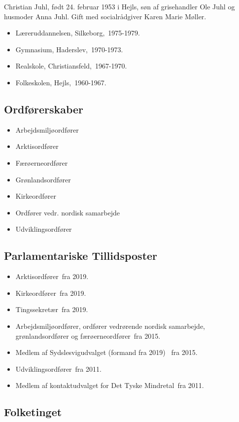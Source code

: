 \documentclass[11pt, a4paper]{awesome-cv}
\begin{document}
\makecvheader[R]
\makelettertitle
\begin{cvletter}
Christian Juhl, født 24. februar 1953 i Hejls, søn af grisehandler Ole Juhl og husmoder Anna Juhl. Gift med socialrådgiver Karen Marie Møller.

\begin{itemize}
\item Læreruddannelsen, Silkeborg, 1975-1979.
\item Gymnasium, Haderslev, 1970-1973.
\item Realskole, Christiansfeld, 1967-1970.
\item Folkeskolen, Hejls, 1960-1967.
\end{itemize}
\subsection*{Ordførerskaber}
\begin{itemize}
\item Arbejdsmiljøordfører
\item Arktisordfører
\item Færøerneordfører
\item Grønlandsordfører
\item Kirkeordfører
\item Ordfører vedr. nordisk samarbejde
\item Udviklingsordfører
\end{itemize}
\subsection*{Parlamentariske Tillidsposter}
\begin{itemize}
\item Arktisordfører fra 2019.
\item Kirkeordfører fra 2019.
\item Tingssekretær fra 2019.
\item Arbejdsmiljøordfører, ordfører vedrørende nordisk samarbejde, grønlandsordfører og færøerneordfører fra 2015.
\item Medlem af Sydslesvigudvalget (formand fra 2019)  fra 2015.
\item Udviklingsordfører fra 2011.
\item Medlem af kontaktudvalget for Det Tyske Mindretal fra 2011.
\end{itemize}
\subsection*{Folketinget}

\end{cvletter}
\end{document}
